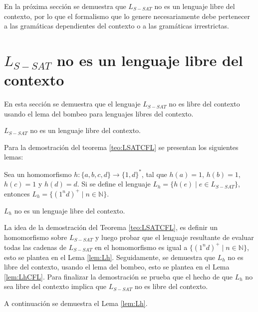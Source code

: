 En la próxima sección se demuestra que $L_{S-SAT}$ no es un lenguaje libre del contexto, por lo que el formalismo que lo genere necesariamente debe pertenecer a las gramáticas dependientes del contexto o a las gramáticas irrestrictas.

\section{$L_{S-SAT}$ no es un lenguaje libre del contexto}
\label{sec:LSATCFL}

En esta sección se demuestra que el lenguaje $L_{S-SAT}$ no es libre del contexto usando el lema del bombeo para lenguajes libres del contexto.

\begin{theorem}
    \label{teo:LSATCFL}
    $L_{S-SAT}$ no es un lenguaje libre del contexto.
\end{theorem}

Para la demostración del teorema \ref{teo:LSATCFL} se presentan los siguientes lemas:

\begin{lemma}
    \label{lem:Lh}
    Sea un homomorfismo $h: \{a,b,c,d\}\to \{1,d\}^*$, tal 
    que $h(a)=1$, $h(b)=1$, $h(c)=1$ y $h(d)=d$. Si se define el lenguaje $L_h=\{h(e)\mid e\in L_{S-SAT}\}$,
    entonces $L_h=\{(1^nd)^+\mid n\in \mathbb{N}\}$.
\end{lemma}

\begin{lemma}
    \label{lem:LhCFL}
    $L_h$ no es un lenguaje libre del contexto.
\end{lemma}

La idea de la demostración del Teorema \ref{teo:LSATCFL}, es definir un homomorfismo sobre $L_{S-SAT}$ y luego probar que el lenguaje resultante de evaluar todas las cadenas de $L_{S-SAT}$ en el homomorfismo es igual a $\{(1^nd)^+\mid n\in \mathbb{N}\}$, esto se plantea en el Lema \ref{lem:Lh}. Seguidamente, se demuestra que $L_h$ no es libre del contexto, usando el lema del bombeo, esto se plantea en el Lema \ref{lem:LhCFL}. Para finalizar la demostración se prueba que el hecho de que $L_h$ no sea libre del contexto implica que $L_{S-SAT}$ no es libre del contexto.

A continuación se demuestra el Lema \ref{lem:Lh}.


